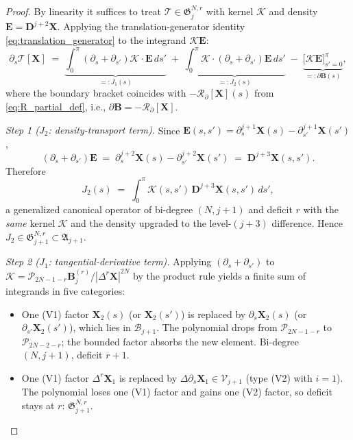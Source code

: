 \documentclass{amsart}
\begin{document}
\begin{proof}
By linearity it suffices to treat $\mathcal{T} \in \mathfrak{G}_j^{N,r}$ with kernel $\mathcal{K}$ and density $\mathbf{E} = \mathbf{D}^{j+2}\mathbf{X}$.  Applying the translation-generator identity \eqref{eq:translation_generator} to the integrand $\mathcal{K}\mathbf{E}$:
\[
\partial_s\mathcal{T}[\mathbf{X}]
\;=\;
\underbrace{\int_0^\pi (\partial_s+\partial_{s'})\mathcal{K}\cdot\mathbf{E}\,ds'}_{=: J_1(s)}
\;+\;
\underbrace{\int_0^\pi \mathcal{K}\cdot(\partial_s+\partial_{s'})\mathbf{E}\,ds'}_{=: J_2(s)}
\;-\;\underbrace{\bigl[\mathcal{K}\mathbf{E}\bigr]_{s'=0}^{\pi}}_{=: \partial\mathbf{B}(s)},
\]
where the boundary bracket coincides with $-\mathcal{R}_\partial[\mathbf X](s)$ from \eqref{eq:R_partial_def}, i.e., $\partial\mathbf{B} = -\mathcal{R}_\partial[\mathbf{X}]$.

\emph{Step 1 ($J_2$: density-transport term).}
Since $\mathbf{E}(s,s') = \partial_s^{j+1}\mathbf{X}(s) - \partial_{s'}^{j+1}\mathbf{X}(s')$,
\[
(\partial_s+\partial_{s'})\mathbf{E}
\;=\; \partial_s^{j+2}\mathbf{X}(s) - \partial_{s'}^{j+2}\mathbf{X}(s')
\;=\; \mathbf{D}^{j+3}\mathbf{X}(s,s').
\]
Therefore
\[
J_2(s) \;=\; \int_0^\pi \mathcal{K}(s,s')\,\mathbf{D}^{j+3}\mathbf{X}(s,s')\,ds',
\]
a generalized canonical operator of bi-degree $(N, j+1)$ and deficit $r$ with the \emph{same} kernel $\mathcal{K}$ and the density upgraded to the level-$(j+3)$ difference.  Hence $J_2 \in \mathfrak{G}_{j+1}^{N,r} \subset \mathfrak{A}_{j+1}$.

\emph{Step 2 ($J_1$: tangential-derivative term).}
Applying $(\partial_s+\partial_{s'})$ to $\mathcal{K} = \mathcal{P}_{2N-1-r}\mathbf{B}_j^{(r)}/|\Delta^r\mathbf{X}|^{2N}$ by the product rule yields a finite sum of integrands in five categories:
\begin{itemize}
\item[(T$_1$)] One (V1) factor $\mathbf{X}_2(s)$ (or $\mathbf{X}_2(s')$) is replaced by $\partial_s\mathbf{X}_2(s)$ (or $\partial_{s'}\mathbf{X}_2(s')$), which lies in $\mathcal{B}_{j+1}$.  The polynomial drops from $\mathcal{P}_{2N-1-r}$ to $\mathcal{P}_{2N-2-r}$; the bounded factor absorbs the new element.  Bi-degree $(N, j+1)$, deficit $r+1$.

\item[(T$_2$)] One (V1) factor $\Delta^r\mathbf{X}_1$ is replaced by $\Delta\partial_s\mathbf{X}_1 \in \mathcal{V}_{j+1}$ (type (V2) with $i=1$).  The polynomial loses one (V1) factor and gains one (V2) factor, so deficit stays at $r$: $\mathfrak{G}_{j+1}^{N,r}$.


\end{itemize}
\end{proof}
\end{document}
